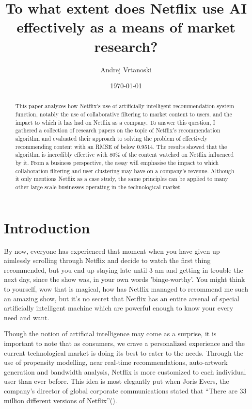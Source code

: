 \documentclass[12pt,a4paper]{article}
\title{To what extent does Netflix use AI effectively as a means of market research?}
\author{Andrej Vrtanoski}
\date{\today}
\begin{document}
\maketitle
\begin{abstract}
	This paper analyzes how Netflix's use of artificially intelligent recommendation system function, notably the use of collaborative filtering to market content to users, and the impact to which it has had on Netflix as a company. To answer this question, I gathered a collection of research papers on the topic of Netflix's recommendation algorithm and evaluated their approach to solving the problem of effectively recommending content with an RMSE of below 0.9514. The results showed that the algorithm is incredibly effective with 80\% of the content watched on Netflix influenced by it. From a business perspective, the essay will emphasise the impact to which collaboration filtering and user clustering may have on a company's revenue. Although it only mentions Netflix as a case study, the same principles can be applied to many other large scale businesses operating in the technological market.
\end{abstract}

\newpage

\section{Introduction}
By now, everyone has experienced that moment when you have given up aimlessly scrolling through Netflix and decide to watch the first thing recommended, but you end up staying late until 3 am and getting in trouble the next day, since the show was, in your own words 'binge-worthy'. You might think to yourself, wow that is magical, how has Netflix managed to recommend me such an amazing show, but it's no secret that Netflix has an entire arsenal of special artificially intelligent machine which are powerful enough to know your every need and want.

Though the notion of artificial intelligence may come as a surprise, it is important to note that as consumers, we crave a personalized experience and the current technological market is doing its best to cater to the needs. Through the use of propensity modelling, near real-time recommendations, auto-artwork generation and bandwidth analysis, Netflix is more customized to each individual user than ever before. This idea is most elegantly put when Joris Evers, the company’s director of global corporate communications stated that \enquote{There are 33 million different versions of Netflix}(\cite{carr2013giving}).
\end{document}
